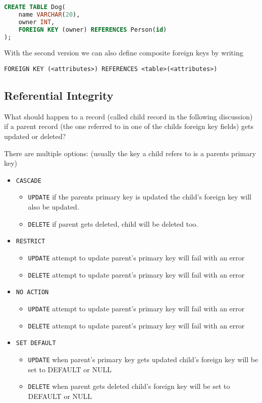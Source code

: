 \documentclass{article}
\renewcommand{\t}[1]{\texttt{#1}}
\begin{document}
\begin{lstlisting}[language=SQL]
CREATE TABLE Dog(
	name VARCHAR(20),
	owner INT,
	FOREIGN KEY (owner) REFERENCES Person(id)
);
\end{lstlisting}

With the second version we can also define composite foreign keys by writing

\t{FOREIGN KEY (<attributes>) REFERENCES <table>(<attributes>)}

\subsection*{Referential Integrity}

What should happen to a record (called child record in the following discussion) if a parent record (the one referred to in one of the childs foreign key fields) gets updated or deleted?

There are multiple options: (usually the key a child refers to is a parents primary key)

\begin{itemize}
	\item \t{CASCADE}
	\begin{itemize} 
		\item \t{UPDATE} if the parents primary key is updated the child's foreign key will also be updated.
		\item \t{DELETE} if parent gets deleted, child will be deleted too.
	\end{itemize}
	\item \t{RESTRICT}
	\begin{itemize} 
		\item \t{UPDATE} attempt to update parent's primary key will fail with an error
		\item \t{DELETE} attempt to update parent's primary key will fail with an error
	\end{itemize}
	\item \t{NO ACTION}
	\begin{itemize} 
		\item \t{UPDATE} attempt to update parent's primary key will fail with an error
		\item \t{DELETE} attempt to update parent's primary key will fail with an error
	\end{itemize}
	\item \t{SET DEFAULT}
	\begin{itemize} 
		\item \t{UPDATE} when parent's primary key gets updated child's foreign key will be set to DEFAULT or NULL
		\item \t{DELETE} when parent gets deleted child's foreign key will be set to DEFAULT or NULL
	\end{itemize}
\end{itemize}
\end{document}

